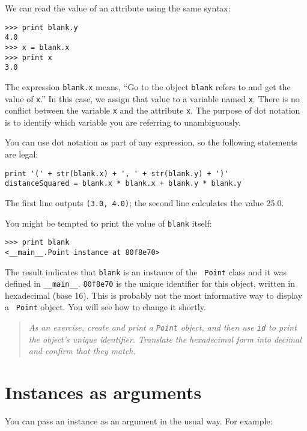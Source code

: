 We can read the value of an attribute using the same syntax:

\beforeverb
\begin{verbatim}
>>> print blank.y
4.0
>>> x = blank.x
>>> print x
3.0
\end{verbatim}
\afterverb
%
The expression {\tt blank.x} means, ``Go to the object {\tt blank}
refers to and get the value of {\tt x}.'' In this case, we assign that
value to a variable named {\tt x}.  There is no conflict between
the variable {\tt x} and the attribute {\tt x}.  The
purpose of dot notation is to identify which variable you are
referring to unambiguously.

You can use dot notation as part of any expression, so the following
statements are legal:

\beforeverb
\begin{verbatim}
print '(' + str(blank.x) + ', ' + str(blank.y) + ')'
distanceSquared = blank.x * blank.x + blank.y * blank.y
\end{verbatim}
\afterverb
%
The first line outputs {\tt (3.0, 4.0)}; the second line calculates
the value 25.0.

You might be tempted to print the value of {\tt blank} itself:

\beforeverb
\begin{verbatim}
>>> print blank
<__main__.Point instance at 80f8e70>
\end{verbatim}
\afterverb
%
The result indicates that {\tt blank} is an instance of the {\tt
Point} class and it was defined in {\tt \_\_main\_\_}.  {\tt 80f8e70}
is the unique identifier for this object, written in hexadecimal (base
16).  This is probably not the most informative way to display a {\tt
Point} object.  You will see how to change it shortly.


\begin{quote}
{\em As an exercise, create and print a {\tt Point} object, and then
use {\tt id} to print the object's unique identifier.
Translate the hexadecimal form into decimal and confirm that they
match.}
\end{quote}


\section{Instances as arguments}

You can pass an instance as an argument in the usual way.
For example:

